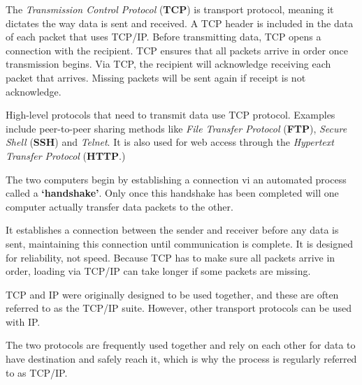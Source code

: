 The \emph{Transmission Control Protocol} (\textbf{TCP}) is transport protocol, meaning it dictates the way data is sent and received. A TCP header is included in the data of each packet that uses TCP/IP. Before transmitting data, TCP opens a connection with the recipient. TCP ensures that all packets arrive in order once transmission begins. Via TCP, the recipient will acknowledge receiving each packet that arrives. Missing packets will be sent again if receipt is not acknowledge.

High-level protocols that need to transmit data use TCP protocol. Examples include peer-to-peer sharing methods like \textit{File Transfer Protocol} (\textbf{FTP}), \textit{Secure Shell} (\textbf{SSH}) and \textit{Telnet}. It is also used for web access through the \textit{Hypertext Transfer Protocol} (\textbf{HTTP}.)

The two computers begin by establishing a connection vi an automated process called a \textbf{`handshake'}. Only once this handshake has been completed will one computer actually transfer data packets to the other.

It establishes a connection between the sender and receiver before any data is sent, maintaining this connection until communication is complete. It is designed for reliability, not speed. Because TCP has to make sure all packets arrive in order, loading via TCP/IP can take longer if some packets are missing.

TCP and IP were originally designed to be used together, and these are often referred to as the TCP/IP suite. However, other transport protocols can be used with IP.

The two protocols are frequently used together and rely on each other for data to have destination and safely reach it, which is why the process is regularly referred to as TCP/IP.
